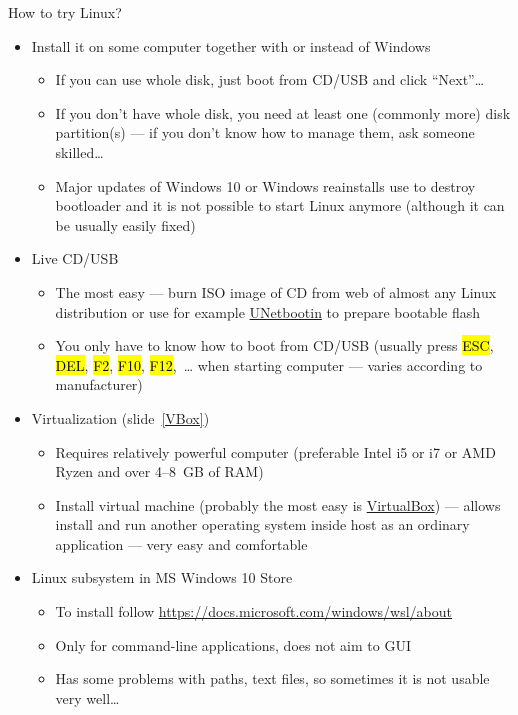 \documentclass[compress, ucs, xelatex, 11pt, xcolor=svgnames, aspectratio=169,
	hyperref={
		bookmarks=true,
		unicode=true,
		colorlinks=true,
		pdftitle={Linux, command line and MetaCentrum},
		plainpages=false,
		pdfauthor={Vojtech Zeisek},
		pdfsubject={Course about use of Linux command line, writing shell scripts and using MetaCentrum of CESNET},
		pdfcreator={XeLaTeX},
		pdfkeywords={Linux, GNU, BASH, shell, command line, MetaCentrum},
		linkcolor=DarkRed, %
		anchorcolor=DarkBlue, %
		citecolor=Indigo, %
		filecolor=NavyBlue, %
		menucolor=DarkMagenta, %
		urlcolor=DarkBlue, %
		pdftex},
	url={hyphens, lowtilde} %
	]{beamer}
\renewcommand{\texttt}[1]{\hl{\ttfamily #1}}
\begin{document}
\begin{frame}[allowframebreaks]{How to try Linux?}
	\begin{itemize}
		\item Install it on some computer together with or instead of Windows
		\begin{itemize}
			\item If you can use whole disk, just boot from CD/USB and click \enquote{Next}\ldots
			\item If you don't have whole disk, you need at least one (commonly more) disk partition(s) --- if you don't know how to manage them, ask someone skilled\ldots
			\item Major updates of Windows 10 or Windows reainstalls use to destroy bootloader and it is not possible to start Linux anymore (although it can be usually easily fixed)
		\end{itemize}
		\item Live CD/USB
		\begin{itemize}
			\item The most easy --- burn ISO image of CD from web of almost any Linux distribution or use for example \href{https://unetbootin.github.io/}{UNetbootin} to prepare bootable flash
			\item You only have to know how to boot from CD/USB (usually press \texttt{ESC}, \texttt{DEL}, \texttt{F2}, \texttt{F10}, \texttt{F12},~\ldots{ }when starting computer --- varies according to manufacturer)
		\end{itemize}
		\item Virtualization (slide~\ref{VBox})
		\begin{itemize}
			\item Requires relatively powerful computer (preferable Intel i5 or i7 or AMD Ryzen and over 4--8~GB of RAM)
			\item Install virtual machine (probably the most easy is \href{https://www.virtualbox.org/}{VirtualBox}) --- allows install and run another operating system inside host as an ordinary application --- very easy and comfortable
		\end{itemize}
		\item Linux subsystem in MS Windows 10 Store
		\begin{itemize}
			\item To install follow \url{https://docs.microsoft.com/windows/wsl/about}
			\item Only for command-line applications, does not aim to GUI
			\item Has some problems with paths, text files, so sometimes it is not usable very well\ldots

\end{itemize}
\end{itemize}
\end{frame}
\end{document}
